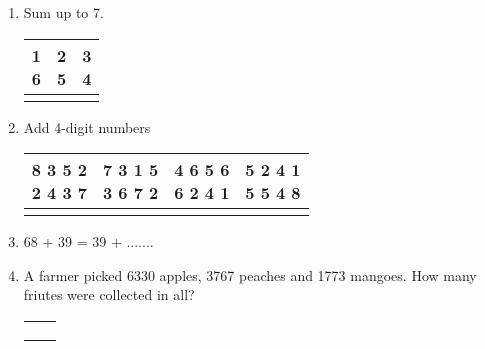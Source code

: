 \begin{enumerate}
    \item Sum up to 7.

    \begin{myTableStyle} \begin{tabular}{ |l|l|l| } \hline
        \makecell[l]{1 \\6} & \makecell[l]{2 \\5} & \makecell[l]{3 \\4} \\\hline
        && \\\hline
    \end{tabular} \end{myTableStyle} \vspace{0.08in}

    \item Add 4-digit numbers

    \begin{myTableStyle} \begin{tabular}{ |m{1.5cm}|m{1.5cm}|m{1.5cm}|m{1.5cm}| } \hline
        \makecell[l]{8 3 5 2 \\2 4 3 7} & \makecell[l]{7 3 1 5 \\3 6 7 2 }
                                    & \makecell[l]{4 6 5 6 \\6 2 4 1} & \makecell[l]{5 2 4 1 \\ 5 5 4 8} \\\hline
        &&& \\\hline
    \end{tabular} \end{myTableStyle} \vspace{0.08in}

    \item 68  +  39 = 39  +  .......

    \item A farmer picked 6330 apples, 3767 peaches and 1773 mangoes. How many friutes were collected in all?

    \begin{myTableStyle} \begin{tabular}{ |m{10cm}|m{3cm}| } \hline
        &  \\\hline
        &  \\\hline
        &  \\\hline
        \multicolumn{2}{|c|}{} \\\hline
    \end{tabular} \end{myTableStyle} \vspace{0.08in}


\end{enumerate}
